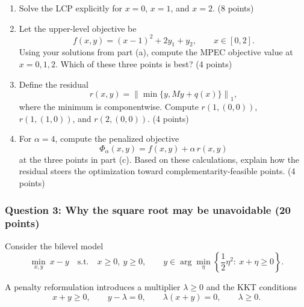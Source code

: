 \documentclass[pdflatex,sn-mathphys-num]{sn-jnl}%
\theoremstyle{definition}
\newcommand{\norm}[1]{\left\lVert #1 \right\rVert}
\begin{document}
\begin{enumerate}[label=(\alph*)]
    \item Solve the LCP explicitly for \(x=0\), \(x=1\), and \(x=2\). (8 points)

    \item Let the upper-level objective be
    \[
    f(x,y)= (x-1)^2 + 2y_1 + y_2,
    \qquad x\in[0,2].
    \]
    Using your solutions from part (a), compute the MPEC objective value at \(x=0,1,2\). Which of these three points is best? (4 points)

    \item Define the residual
    \[
    r(x,y)=\norm{\min\{y,My+q(x)\}}_1,
    \]
    where the minimum is componentwise.
    Compute \(r(1,(0,0))\), \(r(1,(1,0))\), and \(r(2,(0,0))\). (4 points)

    \item For \(\alpha=4\), compute the penalized objective
    \[
    \Phi_\alpha(x,y)=f(x,y)+\alpha\,r(x,y)
    \]
    at the three points in part (c). Based on these calculations, explain how the residual steers the optimization toward complementarity-feasible points. (4 points)
\end{enumerate}

\subsubsection*{Question 3: Why the square root may be unavoidable (20 points)}

Consider the bilevel model
\[
\min_{x,y}\ x-y
\quad \text{s.t.}\quad x\ge 0,\ y\ge 0,\qquad
y\in \arg\min_{\eta}\left\{\frac12 \eta^2:\ x+\eta\ge 0\right\}.
\]

A penalty reformulation introduces a multiplier \(\lambda\ge 0\) and the KKT conditions
\[
x+y\ge 0,\qquad y-\lambda=0,\qquad \lambda(x+y)=0,\qquad \lambda\ge 0.
\]
\end{document}
